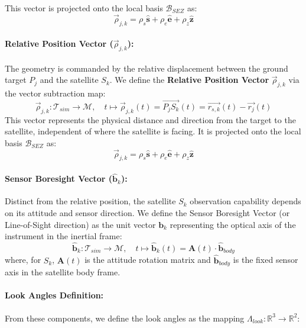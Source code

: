 This vector is projected onto the local basis $\mathcal{B}_{SEZ}$ as:
\begin{equation}
    \vec{\rho}_{j,k} = \rho_s \hat{\mathbf{s}} + \rho_e \hat{\mathbf{e}} + \rho_z \hat{\mathbf{z}}
\end{equation}
\paragraph{Relative Position Vector ($\vec{\rho}_{j,k}$):}
The geometry is commanded by the relative displacement between the ground target $P_j$ and the satellite $S_k$. We define the \textbf{Relative Position Vector}  $\vec{\rho}_{j,k}$ via the vector subtraction map:
\begin{equation}
    \vec{\rho}_{j,k} : \mathcal{T}_{sim} \to \mathcal{M}, \quad t \mapsto \vec{\rho}_{j,k}(t) = \overrightarrow{P_{j}S_{k}}(t) = \overrightarrow{r_{s,k}}(t) - \overrightarrow{r_{j}}(t)
\end{equation}
This vector represents the physical distance and direction from the target to the satellite, independent of where the satellite is facing. It is projected onto the local basis $\mathcal{B}_{SEZ}$ as:
\begin{equation}
    \vec{\rho}_{j,k} = \rho_s \hat{\mathbf{s}} + \rho_e \hat{\mathbf{e}} + \rho_z \hat{\mathbf{z}}
\end{equation}
\paragraph{Sensor Boresight Vector ($\hat{\mathbf{b}}_k$):}
Distinct from the relative position, the satellite $S_k$ observation capability depends on its attitude and sensor direction. We define the Sensor Boresight Vector (or Line-of-Sight direction) as the unit vector $\mathbf{b}_{k}$  representing the optical axis of the instrument in the inertial frame:
\begin{equation}
    \hat{\mathbf{b}}_{k} : \mathcal{T}_{sim} \to \mathcal{M}, \quad t \mapsto \hat{\mathbf{b}}_{k}(t) = \mathbf{A}(t) \cdot \hat{\mathbf{b}}_{body}
\end{equation}
where, for $S_k$, $\mathbf{A}(t)$ is the attitude rotation matrix and $\hat{\mathbf{b}}_{body}$ is the fixed sensor axis in the satellite body frame.

\paragraph{Look Angles Definition:}
From these components, we define the look angles as the mapping $\Lambda_{look}: \mathbb{R}^3 \to \mathbb{R}^2$:

